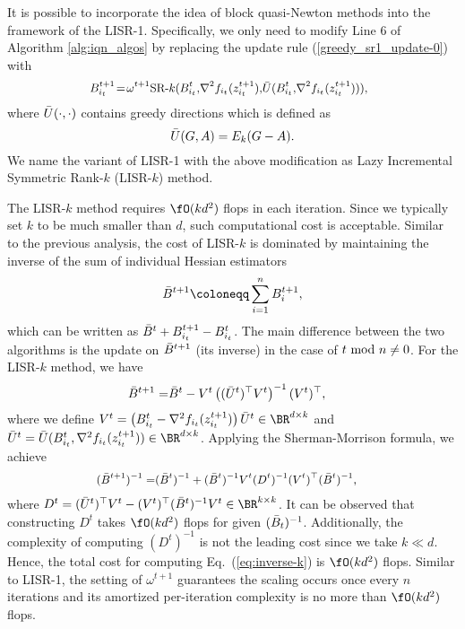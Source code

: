 It is possible to incorporate the idea of block quasi-Newton methods into the framework of the LISR-1.
Specifically, we only need to modify Line 6 of Algorithm \ref{alg:iqn_algos} by replacing the update rule (\ref{greedy_sr1_update-0}) with 
\begin{equation}\label{greedy_srk_update}
\small
\begin{split}    
\!\!\!\!B_{i_t}^{t+1}\!=\!\omega^{t+1} \textrm{SR-}k(B_{i_t}^{t},\!\nabla^2 f_{i_t}(z_{i_t}^{t+1}),\!\Bar{U}(B_{i_t}^{t},\!\nabla^2 f_{i_t}(z_{i_t}^{t+1}))),
\end{split}
\end{equation}
where $\Bar U(\cdot,\cdot)$ contains greedy directions which is defined as
\begin{equation}
    \Bar{U}(G, A)
    = E_k(G-A).
    \label{greedy_matrix}
\end{equation}
We name the variant of LISR-1 with the above modification as Lazy Incremental Symmetric Rank-$k$ (LISR-$k$) method.

The LISR-$k$ method requires $\fO(k d^2)$ flops in each iteration.
Since we typically set $k$ to be much smaller than $d$, such computational cost is acceptable.
Similar to the previous analysis, the cost of LISR-$k$ is dominated by maintaining the inverse of the sum of individual
Hessian estimators 
\begin{equation*}
    \Bar{B}^{t+1} \coloneqq \sum_{i=1}^n B_i^{t+1},
\end{equation*}
which can be written as $\Bar{B}^{t} + B_{i_t}^{t+1} - B_{i_t}^{t}$.
The main difference between the two algorithms is the update on $\Bar B^{t+1}$ (its inverse) in the case of $t~{\rm mod}~n \neq 0$. For the LISR-$k$ method, we have
\begin{equation*}
\begin{split}
        \Bar{B}^{t+1} = &\Bar{B}^{t} - V^{t} \left((\Bar{U}^{t})^{\top} V^{t}\right)^{-1} (V^{t})^{\top},
\end{split}
\end{equation*}
where we define $V^{t}=\left(B_{i_t}^{t}-\nabla^2 f_{i_{t}}(z_{i_{t}}^{t+1})\right) \Bar{U}^{t}\in\BR^{d\times k}$ and $\Bar{U}^{t}=\Bar{U}(B_{i_{t}}^{t}, \nabla^2 f_{i_{t}}(z_{i_{t}}^{t+1}))\in\BR^{d\times k}$. Applying the Sherman-Morrison formula, we achieve
\begin{equation}\label{eq:inverse-k}\small
\begin{split}
    (\Bar{B}^{t+1})^{-1} = & (\Bar{B}^{t})^{-1} + (\Bar{B}^{t})^{-1}  V^{t} (D^{t})^{-1} (V^{t})^{\top} (\Bar{B}^{t})^{-1},
\end{split}
\end{equation}
where $D^{t} = (\Bar{U}^{t})^{\top} V^{t} -  (V^{t})^{\top} (\Bar{B}^{t})^{-1} V^{t}\in\BR^{k\times k}$. 
It can be observed that constructing $D^t$ takes $\fO(k d^2)$ flops for given $(\Bar B_t)^{-1}$. 
Additionally, the complexity of computing $(D^t)^{-1}$ is not the leading cost since we take $k\ll d$.
Hence, the total cost for computing Eq.~(\ref{eq:inverse-k}) is $\fO(k d^2)$ flops.
Similar to LISR-1, the setting of $\omega^{t+1}$ guarantees the scaling occurs once every $n$ iterations and its amortized per-iteration complexity is no more than $\fO(k d^2)$ flops.

